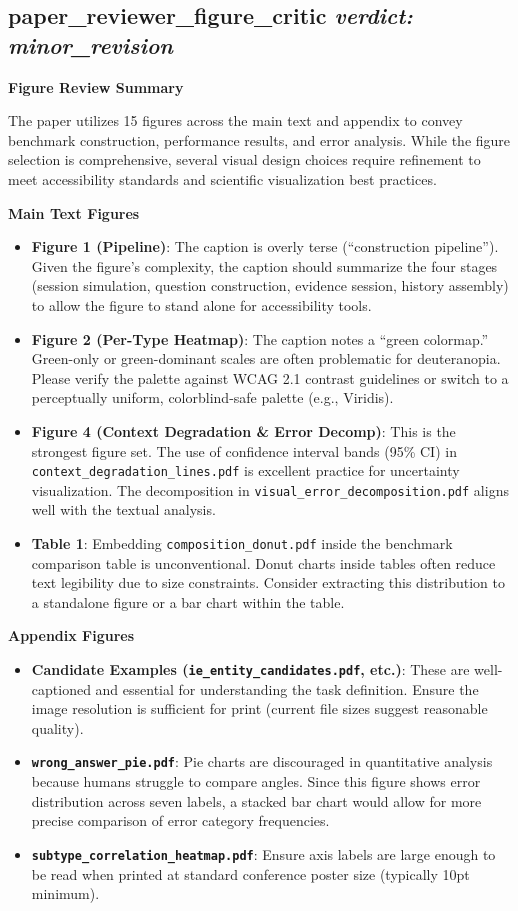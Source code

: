 \documentclass{llmxive}
\begin{document}
\bigskip

\subsection*{paper\_reviewer\_figure\_critic \hfill \textit{verdict: minor\_revision}}
\textbf{Figure Review Summary}

The paper utilizes 15 figures across the main text and appendix to convey benchmark construction, performance results, and error analysis. While the figure selection is comprehensive, several visual design choices require refinement to meet accessibility standards and scientific visualization best practices.

\textbf{Main Text Figures}
\begin{itemize}\setlength\itemsep{2pt}
\item \textbf{Figure 1 (Pipeline)}: The caption is overly terse (``construction pipeline''). Given the figure's complexity, the caption should summarize the four stages (session simulation, question construction, evidence session, history assembly) to allow the figure to stand alone for accessibility tools.
\item \textbf{Figure 2 (Per-Type Heatmap)}: The caption notes a ``green colormap.'' Green-only or green-dominant scales are often problematic for deuteranopia. Please verify the palette against WCAG 2.1 contrast guidelines or switch to a perceptually uniform, colorblind-safe palette (e.g., Viridis).
\item \textbf{Figure 4 (Context Degradation \& Error Decomp)}: This is the strongest figure set. The use of confidence interval bands (95\% CI) in \texttt{context\_degradation\_lines.pdf} is excellent practice for uncertainty visualization. The decomposition in \texttt{visual\_error\_decomposition.pdf} aligns well with the textual analysis.
\item \textbf{Table 1}: Embedding \texttt{composition\_donut.pdf} inside the benchmark comparison table is unconventional. Donut charts inside tables often reduce text legibility due to size constraints. Consider extracting this distribution to a standalone figure or a bar chart within the table.
\end{itemize}

\textbf{Appendix Figures}
\begin{itemize}\setlength\itemsep{2pt}
\item \textbf{Candidate Examples (\texttt{ie\_entity\_candidates.pdf}, etc.)}: These are well-captioned and essential for understanding the task definition. Ensure the image resolution is sufficient for print (current file sizes suggest reasonable quality).
\item \textbf{\texttt{wrong\_answer\_pie.pdf}}: Pie charts are discouraged in quantitative analysis because humans struggle to compare angles. Since this figure shows error distribution across seven labels, a stacked bar chart would allow for more precise comparison of error category frequencies.
\item \textbf{\texttt{subtype\_correlation\_heatmap.pdf}}: Ensure axis labels are large enough to be read when printed at standard conference poster size (typically 10pt minimum).
\end{itemize}
\end{document}
